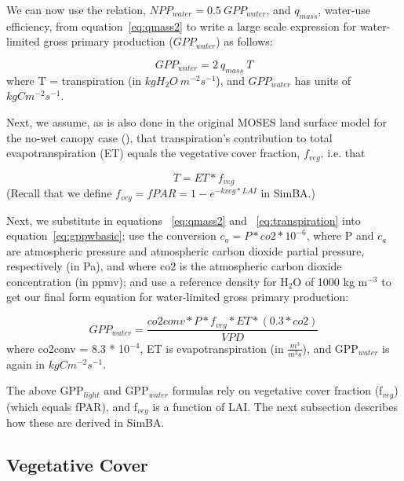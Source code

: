 We can now use the relation, $NPP_{water} = 0.5 \ GPP_{water}$,
and $q_{mass}$, water-use efficiency, from equation~\eqref{eq:qmass2} to write a large scale
expression for water-limited gross primary production ($GPP_{water}$) as follows:

\begin{equation}
\label{eq:gppwbasic}
GPP_{water} = 2 \ q_{mass} \ T
\end{equation}
where T = transpiration (in $kg H_2O \ m^{-2} s^{-1}$), and $GPP_{water}$ has units of $kg C m^{-2} s^{-1}$.

Next, we assume, as is also done in the original MOSES land surface model for the no-wet canopy case (\cite{cox1999}), that transpiration's contribution to total evapotranspiration (ET) equals the vegetative cover fraction, $f_{veg}$, i.e. that

\begin{equation}
\label{eq:transpiration}
T = ET * f_{veg}
\end{equation}
(Recall that we define $f_{veg} = fPAR = 1 - e^{- k{veg} * LAI}$ in SimBA.)

Next, we substitute in equations ~\eqref{eq:qmass2} and ~\eqref{eq:transpiration} into equation~\eqref{eq:gppwbasic}; use the conversion $c_a = P * co2 * 10^{-6}$, where P and $c_a$ are atmospheric pressure and atmospheric carbon dioxide partial pressure, respectively (in Pa), and where co2 is the atmospheric carbon dioxide concentration (in ppmv); and use a reference density for H$_2$O of 1000 kg m$^{-3}$ to get our final form equation for water-limited gross primary production:

\begin{equation}
\label{eq:gppw}
GPP_{water} = \frac{co2conv * P * f_{veg} * ET * (0.3 * co2)}{VPD}
\end{equation}
where co2conv = 8.3 * 10$^{-4}$, ET is evapotranspiration (in $\frac{m^3}{m^2 s}$), and GPP$_{water}$ is again in $kg C m^{-2} s^{-1}$.

The above GPP$_{light}$ and GPP$_{water}$ formulas rely on vegetative cover fraction (f$_{veg}$) (which equals fPAR), and f$_{veg}$ is a function of LAI.  The next subsection describes how these are derived in SimBA.

\subsection{Vegetative Cover}


